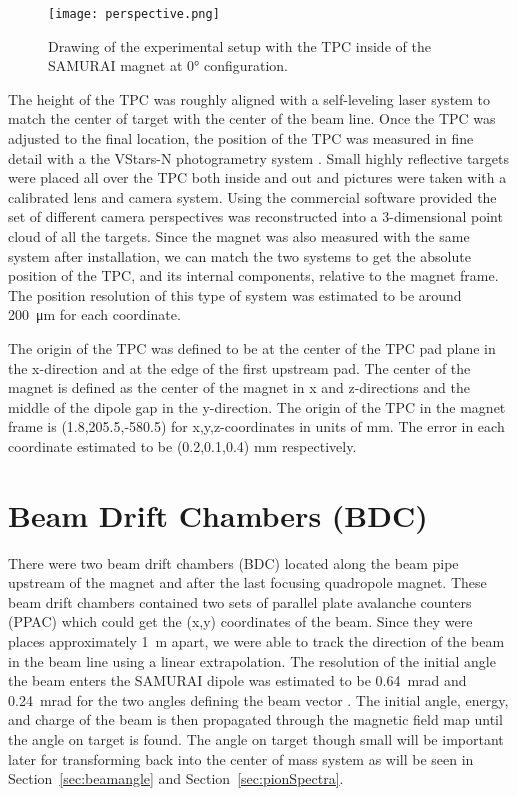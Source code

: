 \begin{figure}
\texttt{[image: perspective.png]}
\caption{Drawing of the experimental setup with the TPC inside of the SAMURAI magnet at $\ang{0}$ configuration.}
\label{fig:experiment}
\end{figure}

The height of the TPC was roughly aligned with a self-leveling laser system to match the center of target with the center of the beam line. Once the TPC was adjusted to the final location, the position of the TPC was measured in fine detail with a the VStars-N photogrametry system \cite{vstars}. Small highly reflective targets were placed all over the TPC both inside and out and pictures were taken with a calibrated lens and camera system. Using the commercial software provided the set of different camera perspectives was reconstructed into a 3-dimensional point cloud of all the targets. Since the magnet was also measured with the same system after installation, we can match the two systems to get the absolute position of the TPC, and its internal components, relative to the magnet frame. The position resolution of this type of system was estimated to be around \SI{200}{\micro\metre} for each coordinate.

The origin of the \spirit TPC was defined to be at the center of the TPC pad plane in the x-direction and at the edge of the first upstream pad. The center of the magnet is defined as the center of the magnet in x and z-directions and the middle of the dipole gap in the y-direction. The origin of the \spirit TPC in the magnet frame is (1.8,205.5,-580.5) for x,y,z-coordinates in units of \si{\milli\metre}. The error in each coordinate estimated to be (0.2,0.1,0.4) \si{\milli\metre} respectively. 


\section{Beam Drift Chambers (BDC)}
\label{sec:bdc}

There were two beam drift chambers (BDC) located along the beam pipe upstream of the magnet and after the last focusing quadropole magnet. These beam drift chambers contained two sets of parallel plate avalanche counters (PPAC) which could get the (x,y) coordinates of the beam. Since they were places approximately \SI{1}{\metre} apart, we were able to track the direction of the beam in the beam line using a linear extrapolation. The resolution of the initial angle the beam enters the SAMURAI dipole was estimated to be \SI{0.64}{\milli\radian} and \SI{0.24}{\milli\radian} for the two angles defining the beam vector \cite{jon}. The initial angle, energy, and charge of the beam is then propagated through the magnetic field map until the angle on target is found. The angle on target though small will be important later for transforming back into the center of mass system as will be seen in Section~\ref{sec:beamangle} and Section~\ref{sec:pionSpectra}.


